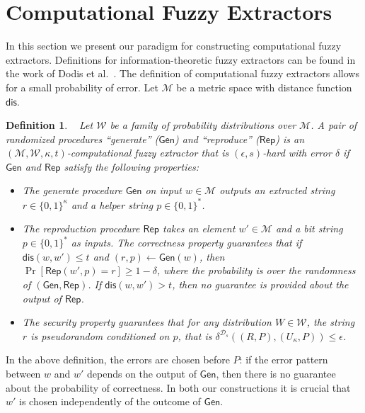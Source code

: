 \documentclass[11pt]{article}
\newcommand{\class}[1]{{\ensuremath{\mathsf{#1}}}}
\newcommand{\gen}{\ensuremath{\class{Gen}}\xspace}
\newcommand{\rep}{\ensuremath{\class{Rep}}\xspace}
\newcommand{\dis}{\ensuremath{\mathsf{dis}}}
\newtheorem{definition}[theorem]{Definition}
\begin{document}
\section{Computational Fuzzy Extractors}
\label{sec:fuzzy extractors}

In this section we present our paradigm for constructing computational fuzzy extractors.  Definitions for information-theoretic fuzzy extractors can be found in the work of Dodis et al.~\cite[Sections 2.5--4.1]{DBLP:journals/siamcomp/DodisORS08}.  The definition of computational fuzzy extractors allows for a small probability of error.  Let $\mathcal{M}$ be a metric space with distance function $\dis$.

\begin{definition}~\cite[Definition 2.5]{fuller2013computational}
\label{def:comp fuzzy extractor}
Let $\mathcal{W}$ be a family of probability distributions over $\mathcal{M}$. A pair of randomized procedures ``generate'' ($\gen$) and ``reproduce'' ($\rep$) is an $(\mathcal{M}, \mathcal{W}, \kappa, t)$-\emph{computational fuzzy extractor} that is $(\epsilon, s)$-hard with error $\delta$ if \gen and \rep satisfy the following properties:
\begin{itemize}
\item The generate procedure \gen on input $w\in \mathcal{M}$ outputs an extracted string $r\in\{0,1\}^\kappa$ and a helper string $p\in\{0,1\}^*$.
\item The reproduction procedure \rep takes an element $w'\in\mathcal{M}$ and a bit string $p\in\{0,1\}^*$ as inputs.  The \emph{correctness} property guarantees that if $\dis(w, w')\leq t$ and $(r, p)\leftarrow \gen(w)$, then $\Pr[\rep( w', p) = r] \geq 1-\delta$, where the probability is over the randomness of $(\gen, \rep)$.
If $\dis(w, w') > t$, then no guarantee is provided about the output of \rep.
\item The \emph{security} property guarantees that for any distribution $W\in \mathcal{W}$, the string $r$ is pseudorandom conditioned on $p$, that is $\delta^{\mathcal{D}_s}((R, P), (U_\kappa, P))\leq \epsilon$.
\end{itemize}
\end{definition}
In the above definition, the errors are chosen before $P$: if the error pattern between $w$ and $w'$ depends on the output of $\gen$, then there is no guarantee about the probability of correctness. In both our constructions it is crucial that $w'$ is chosen independently of the outcome of \gen.
\end{document}
